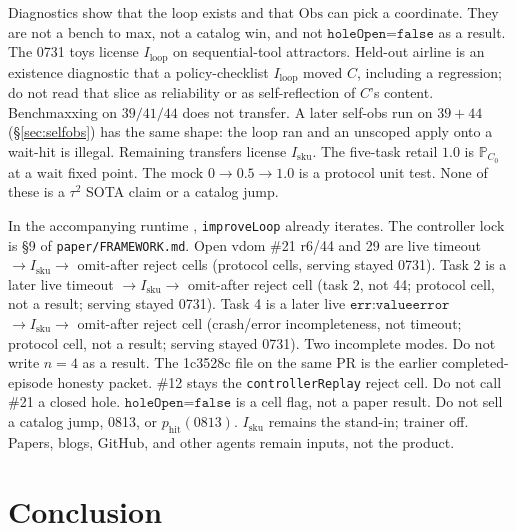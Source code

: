 \documentclass{article}
\begin{document}
Diagnostics show that the loop exists and that \(\mathrm{Obs}\) can pick a coordinate. They are not a bench to max, not a catalog win, and not \(\texttt{holeOpen=false}\) as a result. The 0731 toys license \(I_{\mathrm{loop}}\) on sequential-tool attractors. Held-out airline is an existence diagnostic that a policy-checklist \(I_{\mathrm{loop}}\) moved \(C\), including a regression; do not read that slice as reliability or as self-reflection of \(C\)'s content. Benchmaxxing on \(39/41/44\) does not transfer. A later self-obs run on \(39+44\) (\S\ref{sec:selfobs}) has the same shape: the loop ran and an unscoped apply onto a wait-hit is illegal. Remaining transfers license \(I_{\mathrm{sku}}\). The five-task retail \(1.0\) is \(\mathbb{P}_{C_0}\) at a \(\mathrm{wait}\) fixed point. The mock \(0\to 0.5\to 1.0\) is a protocol unit test. None of these is a \(\tau^2\) SOTA claim or a catalog jump.

In the accompanying runtime \citep{vdomharness}, \texttt{improveLoop} already iterates. The controller lock is \S9 of \texttt{paper/FRAMEWORK.md}. Open vdom \#21 r6/44 and 29 are live timeout \(\to I_{\mathrm{sku}}\to\) omit-after reject cells (protocol cells, serving stayed 0731). Task 2 is a later live timeout \(\to I_{\mathrm{sku}}\to\) omit-after reject cell (task 2, not 44; protocol cell, not a result; serving stayed 0731). Task 4 is a later live \(\texttt{err:valueerror}\) \(\to I_{\mathrm{sku}}\to\) omit-after reject cell (crash/error incompleteness, not timeout; protocol cell, not a result; serving stayed 0731). Two incomplete modes. Do not write \(n=4\) as a result. The 1c3528c file on the same PR is the earlier completed-episode honesty packet. \#12 stays the \texttt{controllerReplay} reject cell. Do not call \#21 a closed hole. \(\texttt{holeOpen=false}\) is a cell flag, not a paper result. Do not sell a catalog jump, 0813, or \(p_{\mathrm{hit}}(0813)\). \(I_{\mathrm{sku}}\) remains the stand-in; trainer off. Papers, blogs, GitHub, and other agents remain inputs, not the product.

\section{Conclusion}
\end{document}
